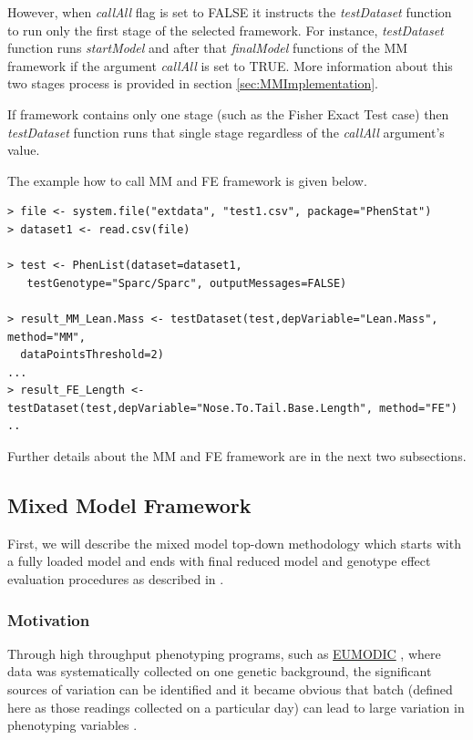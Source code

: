\documentclass[12pt,a4paper]{article}
\begin{document}
However, when \textit{callAll} flag is set to FALSE it instructs the \textit{testDataset} function to run only the first stage of the selected framework.
For instance, \textit{testDataset} function runs \textit{startModel} and after that \textit{finalModel} functions of the MM framework if the argument \textit{callAll} is set to TRUE.  More information about this two stages process is provided in section \ref{sec:MMImplementation}.

If framework contains only one stage (such as the Fisher Exact Test case) then \textit{testDataset} function runs that single stage regardless of the \textit{callAll} argument's value. 

The example how to call MM and FE framework is given below.


\begingroup
    \fontsize{8pt}{12pt}\selectfont
\begin{verbatim}
> file <- system.file("extdata", "test1.csv", package="PhenStat") 
> dataset1 <- read.csv(file)

> test <- PhenList(dataset=dataset1,
   testGenotype="Sparc/Sparc", outputMessages=FALSE)

> result_MM_Lean.Mass <- testDataset(test,depVariable="Lean.Mass", method="MM",
  dataPointsThreshold=2)
...
> result_FE_Length <- testDataset(test,depVariable="Nose.To.Tail.Base.Length", method="FE")
..
\end{verbatim}
\endgroup

Further details about the MM and FE framework are in the next two subsections.

\subsection{Mixed Model Framework}
First, we will describe the mixed model top-down methodology which starts with a fully loaded model and ends with final reduced model and genotype effect evaluation procedures as described in \cite{MM07}. 

\subsubsection{Motivation}
Through high throughput phenotyping programs, such as \href{http://www.eumodic.org/}{EUMODIC} , where data was systematically collected on one genetic background, the significant sources of variation can be identified and it became obvious that batch (defined here as those readings collected on a particular day) can lead to large variation in phenotyping variables \cite{MM12}.  
\end{document}
